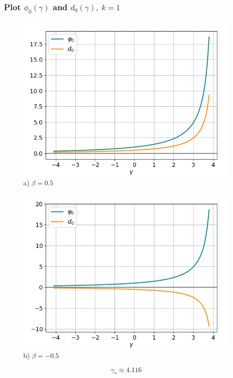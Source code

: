 \documentclass[fullscreen=true, unicode, bookmarks=false]{beamer}
\begin{document}
\begin{frame}
\frametitle{ Plot $ \phi_0(\gamma) $ and $ d_0(\gamma), \; k = 1 $ }

\begin{figure} 
\begin{minipage}[h]{0.49\linewidth}
\begin{center}
\includegraphics[scale=0.39]{divergent_phid_x0_000_beta_05.png} \\ {\scriptsize a) $ \beta = 0.5 $}
\end{center}
\end{minipage} 
\hfill
\begin{minipage}[h]{0.49\linewidth}
\begin{center}
\includegraphics[scale=0.39]{divergent_phid_x0_000_beta_-05.png}  \\ {\scriptsize b) $ \beta = -0.5 $}
\end{center}
\end{minipage} 
\end{figure}
$$ \gamma_* \approx 4.116 $$

\end{frame}
\end{document}
